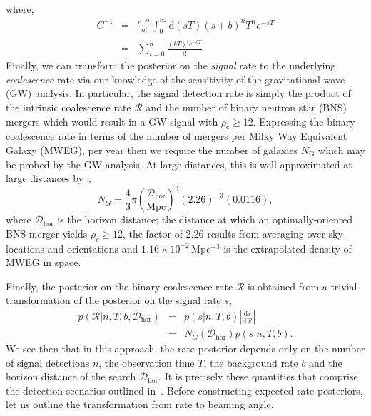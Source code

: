 \documentclass[twocolumn,nofootinbib]{revtex4-1}
\newcommand{\cbcrate}{{{\mathcal R}}}
\newcommand{\diff}{{\mathrm d}}
\newcommand{\dhor}{{\mathcal D}_{\mathrm{hor}}}
\def\bns#1{binary neutron star#1 (BNS#1)\gdef\bns{BNS}}
\def\gw#1{gravitational wave#1 (GW#1)\gdef\gw{GW}}
\def\mweg#1{Milky Way Equivalent Galaxy#1 (MWEG#1)\gdef\mweg{MWEG}}
\begin{document}
%
where,
\begin{eqnarray}
C^{-1} & = &\frac{e^{-bT}}{n!} \int_0^{\infty}\diff(sT)(s+b)^n T^n e^{-sT}\\
& = & \sum_{i=0}^n \frac{ (bT)^i e^{-bT}}{i!}.
\end{eqnarray}
%
Finally, we can transform the posterior on the \emph{signal} rate to the
underlying \emph{coalescence} rate via our knowledge of the sensitivity of the
\gw{} analysis.  In particular,  the signal detection rate is simply the product
of the intrinsic coalescence rate $\cbcrate$ and the number of \bns{} mergers
which would result in a \gw{} signal with $\rho_c\geq12$.   Expressing the
binary coalescence rate in terms of the number of mergers per \mweg{}, per year
then we require the number of galaxies $N_{\mathrm{G}}$ which may be probed by
the \gw{} analysis.  At large distances, this is well approximated at large
distances by~\cite{rates_paper},
%
\begin{equation}
    N_G = \frac{4}{3} \pi \left( \frac{\dhor}{\textrm{Mpc}}
\right)^3 (2.26)^{-3} (0.0116),
\end{equation}
%
where $\dhor$ is the horizon distance; the distance at which an
optimally-oriented \bns{} merger yields $\rho_c\geq12$, the factor of 2.26
results from averaging over sky-locations and orientations and $1.16\times
10^{-2}$\,Mpc$^{-3}$ is the extrapolated density of \mweg{} in space.

Finally, the posterior on the binary coalescence rate $\cbcrate$ is obtained from
a trivial transformation of the posterior on the signal rate $s$,
%
\begin{eqnarray}
    p(\cbcrate|n,T,b,\dhor) & = & p(s|n,T,b) \left|\frac{\diff s}{\diff \cbcrate}\right| \\
                                   & = & N_G(\dhor)p(s|n,T,b).
\end{eqnarray}
%
We see then that in this approach, the rate posterior depends only on the number
of signal detections $n$, the observation time $T$, the background rate $b$ and
the horizon distance of the search $\dhor$.  It is precisely these quantities
that comprise the detection scenarios outlined in~\cite{ade_prospects}.  Before
constructing expected rate posteriors, let us outline the transformation from
rate to beaming angle.
\end{document}
